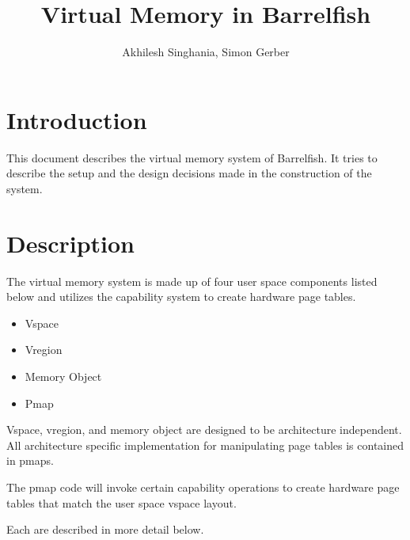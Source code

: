\documentclass[a4paper,twoside]{report} %
\title{Virtual Memory in Barrelfish}   %
\author{Akhilesh Singhania, Simon Gerber}	%
\begin{document}
\maketitle

%
%
\begin{versionhistory}
\end{versionhistory}


\chapter{Introduction}

This document describes the virtual memory system of Barrelfish.
It tries to describe the setup and the design decisions made in the construction of the system.

\chapter{Description}

The virtual memory system is made up of four user space components listed
below and utilizes the capability system to create hardware page tables.

\begin{itemize}
\item Vspace
\item Vregion
\item Memory Object
\item Pmap
\end{itemize}

Vspace, vregion, and memory object are designed to be architecture independent.
All architecture specific implementation for manipulating page tables is contained in pmaps.

The pmap code will invoke certain capability operations to create hardware
page tables that match the user space vspace layout.

Each are described in more detail below.
\end{document}
